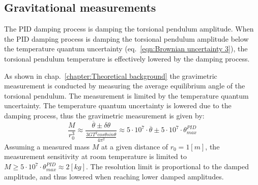 \documentclass[\main/master.tex]{subfiles}
\begin{document}
\subsection{Gravitational measurements}
The PID damping process is damping the torsional pendulum amplitude. When the PID damping process is damping the torsional pendulum amplitude below the temperature quantum uncertainty (eq.~\ref{eqn:Brownian uncertainty 3}), the torsional pendulum temperature is effectively lowered by the damping process.
\par\noindent
As shown in chap.~\ref{chapter:Theoretical background} the gravimetric measurement is conducted by measuring the average equilibrium angle of the torsional pendulum. The measurement is limited by the temperature quantum uncertainty. The temperature quantum uncertainty is lowered due to the damping process, thus the gravimetric measurement is given by:
\begin{equation}
\frac{M}{r_0^3} \approx \frac{\overline{\theta}\pm \delta\theta}{\frac{3GT^2cos\theta sin\theta}{4\pi^2 }} \approx 5\cdot 10^{7}\cdot \overline{\theta}\pm 5\cdot 10^{7}\cdot \theta_{max}^{PID}
\label{eqn:measurement resolution}
\end{equation}
Assuming a measured mass $M$ at a given distance of $r_0 = 1[m]$, the measurement sensitivity at room temperature is limited to $M\geq 5\cdot 10^{7}\cdot \theta_{max}^{PID}\approx 2[kg]$. The resolution limit is proportional to the damped amplitude, and thus lowered when reaching lower damped amplitudes.
\end{document}
